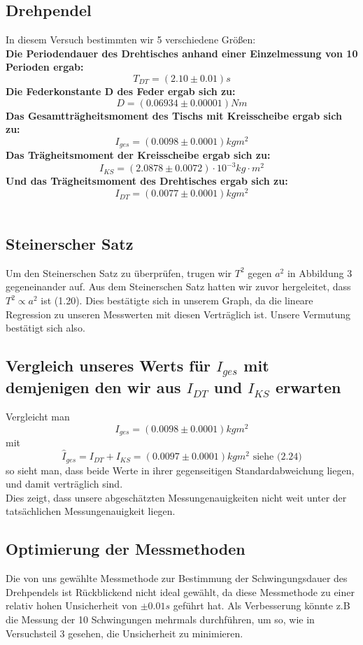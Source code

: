 \documentclass[11pt,a4paper]{article}
\begin{document}
	\subsection{Drehpendel}
	In diesem Versuch bestimmten wir 5 verschiedene Größen:\\
	{\bf Die Periodendauer des Drehtisches anhand einer Einzelmessung von 10 Perioden ergab:}
	$$T_{DT}=(2.10\pm 0.01)s$$
	{\bf Die Federkonstante D des Feder ergab sich zu:}
	$$D=(0.06934 \pm 0.00001) Nm $$
	{\bf Das Gesamtträgheitsmoment des Tischs mit Kreisscheibe ergab sich zu:}
	$$I_{ges}=(0.0098 \pm 0.0001)kgm^2$$
	{\bf Das Trägheitsmoment der Kreisscheibe ergab sich zu:}
	$$	I_{KS}=(2.0878 \pm 0.0072)\cdot 10^{-3} kg \cdot m^2$$
	{\bf Und das Trägheitsmoment des Drehtisches ergab sich zu:}
	$$	I_{DT}=(0.0077 \pm 0.0001)kgm^2 $$
	\\
	\subsection{Steinerscher Satz}
	Um den Steinerschen Satz zu überprüfen, trugen wir $T^2$ gegen $a^2$ in Abbildung 3 gegeneinander auf.
	Aus dem Steinerschen Satz hatten wir zuvor hergeleitet, dass $T^2 \propto a^2$ ist (1.20).
	Dies bestätigte sich in unserem Graph, da die lineare Regression zu unseren Messwerten mit diesen Verträglich ist.
	Unsere Vermutung bestätigt sich also.
	\subsection{Vergleich unseres Werts für $I_{ges}$ mit demjenigen den wir aus $I_{DT}$ und $I_{KS}$ erwarten}
	Vergleicht man $$I_{ges}=(0.0098 \pm 0.0001)kgm^2$$
	mit $$\hat{I}_{ges}=I_{DT}+I_{KS}=(0.0097 \pm 0.0001)kgm^2 \text{ siehe (2.24)}$$
	so sieht man, dass beide Werte in ihrer gegenseitigen Standardabweichung liegen, und damit verträglich sind. \\
	Dies zeigt, dass unsere abgeschätzten Messungenauigkeiten nicht weit unter der tatsächlichen Messungenauigkeit liegen.

	\subsection{Optimierung der Messmethoden}
	Die von uns gewählte Messmethode zur Bestimmung der Schwingungsdauer des Drehpendels ist Rückblickend nicht ideal gewählt, da diese Messmethode zu einer relativ hohen Unsicherheit von $\pm 0.01s$ geführt hat.
	Als Verbesserung könnte z.B die Messung der 10 Schwingungen mehrmals durchführen, um so, wie in Versuchsteil 3 gesehen, die Unsicherheit zu minimieren.
\end{document}
